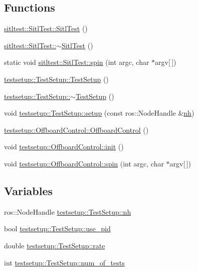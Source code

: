 \subsection*{Functions}
\begin{DoxyCompactItemize}
\item 
\mbox{\hyperlink{group__sitl__test_ga4e6f992c799d276e008e38fb25ee6a8d}{sitltest\+::\+Sitl\+Test\+::\+Sitl\+Test}} ()
\item 
\mbox{\hyperlink{group__sitl__test_gae851257616c8079c36a14c48c49f1f9b}{sitltest\+::\+Sitl\+Test\+::$\sim$\+Sitl\+Test}} ()
\item 
static void \mbox{\hyperlink{group__sitl__test_ga02981fb9641a69a1f577a72c30f3a857}{sitltest\+::\+Sitl\+Test\+::spin}} (int argc, char $\ast$argv\mbox{[}$\,$\mbox{]})
\item 
\mbox{\hyperlink{group__sitl__test_gaa1e6e5d6eda73c0fd35932f562fc9537}{testsetup\+::\+Test\+Setup\+::\+Test\+Setup}} ()
\item 
\mbox{\hyperlink{group__sitl__test_ga172d41e243ecb1ce863fdb203acc8070}{testsetup\+::\+Test\+Setup\+::$\sim$\+Test\+Setup}} ()
\item 
void \mbox{\hyperlink{group__sitl__test_ga8d8d5e70f33e67398c343a4804ee1a89}{testsetup\+::\+Test\+Setup\+::setup}} (const ros\+::\+Node\+Handle \&\mbox{\hyperlink{group__sitl__test_gab33b5c9c5ebfe96b53fd53b93ba4ae0e}{nh}})
\item 
\mbox{\hyperlink{group__sitl__test_ga069b39408b92308e5a160e6da217a76d}{testsetup\+::\+Offboard\+Control\+::\+Offboard\+Control}} ()
\item 
void \mbox{\hyperlink{group__sitl__test_ga96ffcf517eede8e7fca2a9f156a88544}{testsetup\+::\+Offboard\+Control\+::init}} ()
\item 
void \mbox{\hyperlink{group__sitl__test_ga2750006357c60814f9ea8fdc1fb0d379}{testsetup\+::\+Offboard\+Control\+::spin}} (int argc, char $\ast$argv\mbox{[}$\,$\mbox{]})
\end{DoxyCompactItemize}
\subsection*{Variables}
\begin{DoxyCompactItemize}
\item 
ros\+::\+Node\+Handle \mbox{\hyperlink{group__sitl__test_gab33b5c9c5ebfe96b53fd53b93ba4ae0e}{testsetup\+::\+Test\+Setup\+::nh}}
\item 
bool \mbox{\hyperlink{group__sitl__test_ga3c95d693bf1b2c713c6d8d6f8a5c73b3}{testsetup\+::\+Test\+Setup\+::use\+\_\+pid}}
\item 
double \mbox{\hyperlink{group__sitl__test_ga912ce4eeed9553edb6bf2e636685a3a8}{testsetup\+::\+Test\+Setup\+::rate}}
\item 
int \mbox{\hyperlink{group__sitl__test_ga53ac99edc3a6966ca9233341c7d58dee}{testsetup\+::\+Test\+Setup\+::num\+\_\+of\+\_\+tests}}
\end{DoxyCompactItemize}



